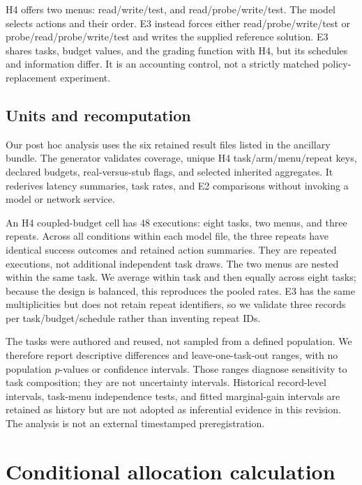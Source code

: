 \documentclass[11pt]{article}
\begin{document}
H4 offers two menus: read/write/test, and read/probe/write/test. The model selects actions and their order. E3 instead forces either read/probe/write/test or probe/read/probe/write/test and writes the supplied reference solution. E3 shares tasks, budget values, and the grading function with H4, but its schedules and information differ. It is an accounting control, not a strictly matched policy-replacement experiment.



\subsection{Units and recomputation}
Our post hoc analysis uses the six retained result files listed in the ancillary bundle. The generator validates coverage, unique H4 task/arm/menu/repeat keys, declared budgets, real-versus-stub flags, and selected inherited aggregates. It rederives latency summaries, task rates, and E2 comparisons without invoking a model or network service.

An H4 coupled-budget cell has 48 executions: eight tasks, two menus, and three repeats. Across all conditions within each model file, the three repeats have identical success outcomes and retained action summaries. They are repeated executions, not additional independent task draws. The two menus are nested within the same task. We average within task and then equally across eight tasks; because the design is balanced, this reproduces the pooled rates. E3 has the same multiplicities but does not retain repeat identifiers, so we validate three records per task/budget/schedule rather than inventing repeat IDs.

The tasks were authored and reused, not sampled from a defined population. We therefore report descriptive differences and leave-one-task-out ranges, with no population $p$-values or confidence intervals. Those ranges diagnose sensitivity to task composition; they are not uncertainty intervals. Historical record-level intervals, task-menu independence tests, and fitted marginal-gain intervals are retained as history but are not adopted as inferential evidence in this revision. The analysis is not an external timestamped preregistration.

\section{Conditional allocation calculation}
\end{document}
